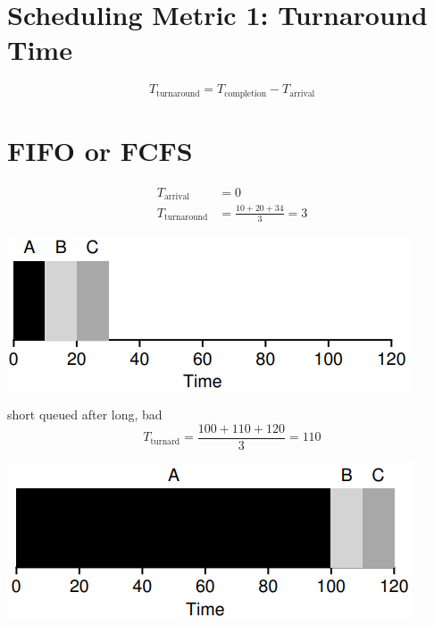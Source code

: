 \section*{Scheduling Metric 1: Turnaround Time}
\begin{equation}
  \label{eq:turnaround}
  T_{\text{turnaround}} = T_{\text{completion}} - T_{\text{arrival}}
\end{equation}
\begin{minipage}{.5\linewidth}
\section*{FIFO or FCFS}
\begin{align*}
  T_{\text{arrival}}    & = 0 \\
  T_{\text{turnaround}} & = \frac{10+20+34}{3} = 3
\end{align*}
\end{minipage}
\begin{minipage}{.5\linewidth}
  \includegraphics[width=\linewidth]{imgs/sched_fifo1}
\end{minipage}
\begin{minipage}{.5\linewidth}
short queued after long, bad
\begin{equation*}
  T_{\text{turnard}} = \frac{100+110+120}{3} = 110
\end{equation*}
\end{minipage}
\begin{minipage}{.5\linewidth}
  \includegraphics[width=\linewidth]{imgs/sched_fifo2}
\end{minipage}
